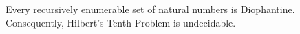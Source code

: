 Every recursively enumerable set of natural numbers is Diophantine. Consequently, Hilbert's Tenth Problem is undecidable.
